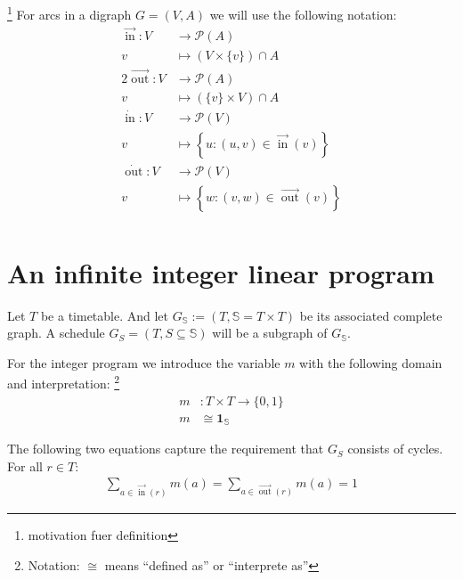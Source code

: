 \documentclass[a4paper]{amsart} %
\newcommand{\todo}[1]{\footnote{#1}}
\DeclareMathOperator{\In}{in}
\DeclareMathOperator{\Out}{out}
\newcommand{\ina}{\ensuremath{\vec{\In}}}
\newcommand{\outa}{\ensuremath{\vec{\Out}}}
\newcommand{\inv}{\ensuremath{\dot{\In}}}
\newcommand{\outv}{\ensuremath{\dot{\Out}}}
\begin{document}
\todo{motivation fuer definition}
For arcs in a digraph \(G=(V,A)\) we will use the following notation:
\begin{align*}
\ina\colon  V &\to \mathcal{P}(A) \\
v &\mapsto \left(V \times \{v\}\right) \cap A\\
2%
\outa\colon  V &\to \mathcal{P}(A) \\
v &\mapsto \left(\{v\} \times V\right) \cap A\\
\inv\colon  V &\to \mathcal{P}(V) \\
v &\mapsto \left\{ u \colon \left(u,v\right) \in \ina(v) \right\}\\
\outv\colon  V &\to \mathcal{P}(V) \\
v &\mapsto \left\{w \colon \left(v,w\right) \in \outa\left(v\right) \right\}\\
\end{align*}

\section{An infinite integer linear program}

Let \(T\) be a timetable.  And let \(G_\mathbb{S} := (T, \mathbb{S} =
T \times T) \) be its associated complete graph.  A schedule \(G_S = (T, S \subseteq \mathbb{S})\)
will be a subgraph of \(G_\mathbb{S}\).


For the integer program we introduce the variable \(m\) with the following domain and interpretation:
\todo{Notation: \(\cong\) means ``defined as'' or ``interprete as''}
\begin{align}
  m & \colon T \times T \to \{0,1\} \\
  m & \cong \mathbf{1}_{\mathbb{S}}
\end{align}


The following two equations capture the requirement that \(G_S\) consists of cycles.  For all \(r \in T\):
\begin{align}
  \label{matchBedingung}
  \sum_{a \in \ina(r)}  m(a) = \sum_{a \in \outa(r)} m(a) = 1
\end{align}
\end{document}
